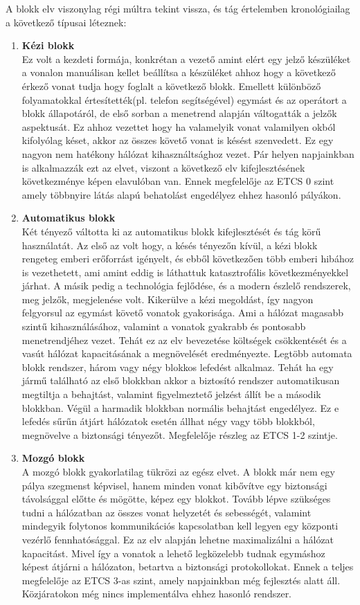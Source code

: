 \documentclass[a4paper,12pt]{article}
\begin{document}
A blokk elv viszonylag régi múltra tekint vissza, és tág értelemben kronológiailag a következő típusai léteznek:
\begin{enumerate}
	\item \textbf{Kézi blokk}\\
	Ez volt a kezdeti formája, konkrétan a vezető amint elért egy jelző készüléket a vonalon manuálisan kellet beállítsa a készüléket ahhoz hogy a következő érkező vonat tudja hogy foglalt a következő blokk.
	Emellett különböző folyamatokkal értesítették(pl. telefon segítségével) egymást és az operátort a blokk állapotáról, de első sorban a menetrend alapján váltogatták a jelzők aspektusát.
	Ez ahhoz vezettet hogy ha valamelyik vonat valamilyen okból kifolyólag késet, akkor az összes követő vonat is késést szenvedett. Ez egy nagyon nem hatékony hálózat kihasználtsághoz vezet.
	Pár helyen napjainkban is alkalmazzák ezt az elvet, viszont a következő elv kifejlesztésének következménye képen elavulóban van.
	Ennek megfelelője az ETCS 0 szint amely többnyire látás alapú behatolást engedélyez ehhez hasonló pályákon.
	\item \textbf{Automatikus blokk}\\
	Két tényező váltotta ki az automatikus blokk kifejlesztését és tág körű használatát.
	Az első az volt hogy, a késés tényezőn kívül, a kézi blokk rengeteg emberi erőforrást igényelt, és ebből következően több emberi hibához is vezethetett, ami amint eddig is láthattuk katasztrofális következményekkel járhat.
	A másik pedig a technológia fejlődése, és a modern észlelő rendszerek, meg jelzők, megjelenése volt.
	Kikerülve a kézi megoldást, így nagyon felgyorsul az egymást követő vonatok gyakorisága. Ami a hálózat magasabb szintű kihasználásához, valamint a vonatok gyakrabb és pontosabb menetrendjéhez vezet.
	Tehát ez az elv bevezetése költségek csökkentését és a vasút hálózat kapacitásának a megnövelését eredményezte. 
	Legtöbb automata blokk rendszer, három vagy négy blokkos lefedést alkalmaz. Tehát ha egy jármű található az első blokkban akkor a biztosító rendszer automatikusan megtiltja a behajtást, valamint figyelmeztető jelzést állít be a második blokkban.
	Végül a harmadik blokkban normális behajtást engedélyez. Ez e lefedés sűrűn átjárt hálózatok esetén állhat négy vagy több blokkból, megnövelve a biztonsági tényezőt.
	Megfelelője részleg az ETCS 1-2 szintje.
	\item \textbf{Mozgó blokk}\\
	A mozgó blokk gyakorlatilag tükrözi az egész elvet. A blokk már nem egy pálya szegmenst képvisel, hanem minden vonat kibővítve egy biztonsági távolsággal előtte és mögötte, képez egy blokkot.
	Tovább lépve szükséges tudni a hálózatban az összes vonat helyzetét és sebességét, valamint mindegyik folytonos kommunikációs kapcsolatban kell legyen egy központi vezérlő fennhatósággal.
	Ez az elv alapján lehetne maximalizálni a hálózat kapacitást. Mivel így a vonatok a lehető legközelebb tudnak egymáshoz képest átjárni a hálózaton, betartva a biztonsági protokollokat.
	Ennek a teljes megfelelője az ETCS 3-as szint, amely napjainkban még fejlesztés alatt áll. Közjáratokon még nincs implementálva ehhez hasonló rendszer.	
\end{enumerate}
\end{document}
